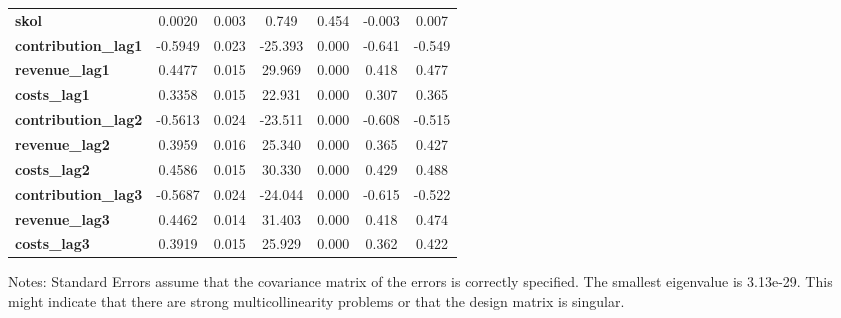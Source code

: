 \begin{center}
\begin{tabular}{lcccccc}
\textbf{skol}                             &       0.0020  &        0.003     &     0.749  &         0.454        &       -0.003    &        0.007     \\
\textbf{contribution\_lag1}               &      -0.5949  &        0.023     &   -25.393  &         0.000        &       -0.641    &       -0.549     \\
\textbf{revenue\_lag1}                    &       0.4477  &        0.015     &    29.969  &         0.000        &        0.418    &        0.477     \\
\textbf{costs\_lag1}                      &       0.3358  &        0.015     &    22.931  &         0.000        &        0.307    &        0.365     \\
\textbf{contribution\_lag2}               &      -0.5613  &        0.024     &   -23.511  &         0.000        &       -0.608    &       -0.515     \\
\textbf{revenue\_lag2}                    &       0.3959  &        0.016     &    25.340  &         0.000        &        0.365    &        0.427     \\
\textbf{costs\_lag2}                      &       0.4586  &        0.015     &    30.330  &         0.000        &        0.429    &        0.488     \\
\textbf{contribution\_lag3}               &      -0.5687  &        0.024     &   -24.044  &         0.000        &       -0.615    &       -0.522     \\
\textbf{revenue\_lag3}                    &       0.4462  &        0.014     &    31.403  &         0.000        &        0.418    &        0.474     \\
\textbf{costs\_lag3}                      &       0.3919  &        0.015     &    25.929  &         0.000        &        0.362    &        0.422     \\
\bottomrule
\end{tabular}
\end{center}

Notes: \newline
 [1] Standard Errors assume that the covariance matrix of the errors is correctly specified. \newline
 [2] The smallest eigenvalue is 3.13e-29. This might indicate that there are \newline
 strong multicollinearity problems or that the design matrix is singular.